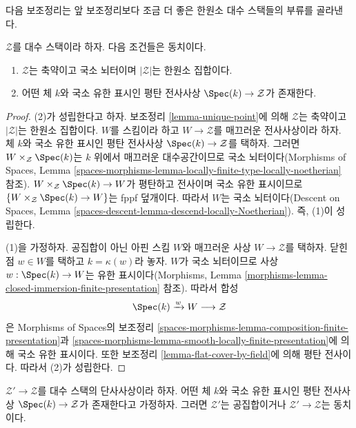 \noindent
다음 보조정리는 앞 보조정리보다 조금 더 좋은 한원소 대수 스택들의 부류를 골라낸다.

\begin{lemma}
\label{lemma-unique-point-better}
$\mathcal{Z}$를 대수 스택이라 하자. 다음 조건들은 동치이다.
\begin{enumerate}
\item $\mathcal{Z}$는 축약이고 국소 뇌터이며
$|\mathcal{Z}|$는 한원소 집합이다.
\item 어떤 체 $k$와 국소 유한 표시인 평탄 전사사상
$\Spec(k) \to \mathcal{Z}$가 존재한다.
\end{enumerate}
\end{lemma}

\begin{proof}
(2)가 성립한다고 하자. 보조정리 \ref{lemma-unique-point}에 의해
$\mathcal{Z}$는 축약이고 $|\mathcal{Z}|$는 한원소 집합이다.
$W$를 스킴이라 하고 $W \to \mathcal{Z}$를 매끄러운 전사사상이라 하자.
체 $k$와 국소 유한 표시인 평탄 전사사상
$\Spec(k) \to \mathcal{Z}$를 택하자. 그러면
$W \times_\mathcal{Z} \Spec(k)$는 $k$ 위에서 매끄러운 대수공간이므로
국소 뇌터이다(Morphisms of Spaces, Lemma
\ref{spaces-morphisms-lemma-locally-finite-type-locally-noetherian} 참조).
$W \times_\mathcal{Z} \Spec(k) \to W$가 평탄하고 전사이며
국소 유한 표시이므로
$\{W \times_\mathcal{Z} \Spec(k) \to W\}$는 fppf 덮개이다.
따라서 $W$는 국소 뇌터이다(Descent on Spaces, Lemma
\ref{spaces-descent-lemma-descend-locally-Noetherian}). 즉, (1)이 성립한다.

\medskip\noindent
(1)을 가정하자. 공집합이 아닌 아핀 스킴 $W$와 매끄러운 사상
$W \to \mathcal{Z}$를 택하자. 닫힌점 $w \in W$를 택하고
$k = \kappa(w)$라 놓자. $W$가 국소 뇌터이므로 사상
$w : \Spec(k) \to W$는 유한 표시이다(Morphisms,
Lemma \ref{morphisms-lemma-closed-immersion-finite-presentation} 참조).
따라서 합성
$$
\Spec(k) \xrightarrow{w} W \longrightarrow \mathcal{Z}
$$
은 Morphisms of Spaces의 보조정리
\ref{spaces-morphisms-lemma-composition-finite-presentation}과
\ref{spaces-morphisms-lemma-smooth-locally-finite-presentation}에 의해
국소 유한 표시이다. 또한 보조정리 \ref{lemma-flat-cover-by-field}에 의해
평탄 전사이다. 따라서 (2)가 성립한다.
\end{proof}

\begin{lemma}
\label{lemma-monomorphism-into-point}
$\mathcal{Z}' \to \mathcal{Z}$를 대수 스택의 단사사상이라 하자.
어떤 체 $k$와 국소 유한 표시인 평탄 전사사상
$\Spec(k) \to \mathcal{Z}$가 존재한다고 가정하자. 그러면
$\mathcal{Z}'$는 공집합이거나 $\mathcal{Z}' \to \mathcal{Z}$는 동치이다.
\end{lemma}

